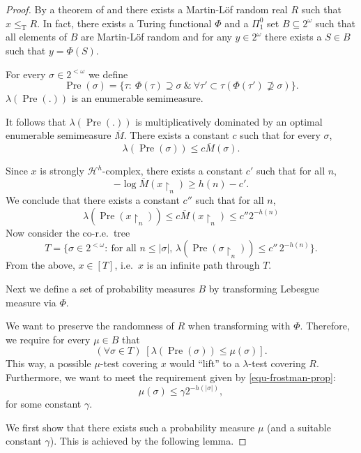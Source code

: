 \documentclass[11pt,reqno]{article}
\theoremstyle{plain}
\theoremstyle{definition}
\theoremstyle{remark}
\numberwithin{equation}{section}
\newcommand{\Cant}{\ensuremath{2^{\omega}}}
\newcommand{\Str}[1][<\omega]{\ensuremath{2^{#1}}}
\newcommand{\Sle}{\ensuremath{\subset}}
\newcommand{\Sgeq}{\ensuremath{\supseteq}}
\newcommand{\Rest}[1]{\ensuremath{\!\restriction_{#1}}}
\newcommand{\Hmeas}{\ensuremath{\mathcal{H}}}
\newcommand{\Hm}[1]{\ensuremath{\Hmeas^{#1}}}
\newcommand{\Leb}{\ensuremath{\lambda}}
\DeclareMathOperator{\T}{T}
\DeclareMathOperator{\Pre}{Pre}
\begin{document}
\begin{proof}
	By a theorem of \citet{kucera:1985} and \citet{gacs:1986} there exists a Martin-L\"of random real $R$ such that $x \leq_{\T} R$. In fact, there exists a Turing functional $\Phi$ and a $\Pi^0_1$ set $B \subseteq \Cant$ such that all elements of $B$ are Martin-L\"of random and for any $y \in \Cant$ there exists a $S \in B$ such that $y = \Phi(S)$.
		
	For every $\sigma \in \Str$ we define 
	$$
		\Pre(\sigma) = \{ \tau : \: \Phi(\tau) \Sgeq \sigma \: \& \: \forall \tau' \Sle \tau (\Phi(\tau') \nsupseteq \sigma) \}.
	$$ 
	$\Leb(\Pre(.))$ is an enumerable semimeasure. 
		
	It follows that $\Leb(\Pre(.))$ is multiplicatively dominated by an optimal enumerable semimeasure $\overline{M}$. There exists a constant $c$ such that for every $\sigma$,
	\[
		\Leb(\Pre(\sigma)) \leq c \overline{M}(\sigma).
	\]
	
	Since $x$ is strongly $\Hm{h}$-complex, there exists a constant $c'$ such that for all $n$,
	\[
		-\log \overline{M}(x\Rest{n}) \geq h(n) - c'.
	\]
	We conclude that there exists a constant $c''$ such that for all $n$,
	\[
		\Leb(\Pre(x\Rest{n})) \leq c \overline{M}(x\Rest{n}) \leq c'' 2^{-h(n)}
	\]
	Now consider the co-r.e.\ tree
	\[
		T = \{\sigma \in \Str: \: \text{for all $n \leq |\sigma|$, } \Leb(\Pre(\sigma\Rest{n})) \leq c''\, 2^{-h(n)} \}.
	\]
	From the above, $x \in [T]$, i.e.\ $x$ is an infinite path through $T$.
	
	Next we define a set of probability measures $B$ by transforming Lebesgue measure via $\Phi$.
	
	We want to preserve the randomness of $R$ when transforming with $\Phi$. Therefore, we require for every $\mu \in B$ that
	\begin{equation} \label{equ-lower_bound_measure}
		(\forall \sigma\in T) \; [\Leb(\Pre(\sigma)) \leq \mu(\sigma)].
	\end{equation}
	This way, a possible $\mu$-test covering $x$ would ``lift'' to a $\Leb$-test covering $R$.
	Furthermore, we want to meet the requirement given by \eqref{equ-frostman-prop}:
	\begin{equation} \label{equ-upper_bound_measure}
		\mu(\sigma) \leq \gamma 2^{-h(|\sigma|)},
	\end{equation}
	for some constant $\gamma$.
	
	We first show that there exists such a probability measure $\mu$ (and a suitable constant $\gamma$). This is achieved by the following lemma.
	

\end{proof}
\end{document}
